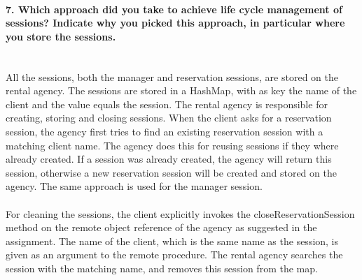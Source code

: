\documentclass{ds-report}
\begin{document}
	\paragraph{7. Which approach did you take to achieve life cycle management of sessions? Indicate why you picked this approach, in particular where you store the sessions.} \mbox{}\\
All the sessions, both the manager and reservation sessions, are stored on the rental agency. The sessions are stored in a HashMap, with as key the name of the client and the value equals the session. The rental agency is responsible for creating, storing and closing sessions. When the client asks for a reservation session, the agency first tries to find an existing reservation session with a matching client name. The agency does this for reusing sessions if they where already created. If a session was already created, the agency will return this session, otherwise a new reservation session will be created and stored on the agency. The same approach is used for the manager session.\\\\
For cleaning the sessions, the client explicitly invokes the closeReservationSession method on the remote object reference of the agency as suggested in the assignment. The name of the client, which is the same name as the session, is given as an argument to the remote procedure. The rental agency searches the session with the matching name, and removes this session from the map.
\end{document}
